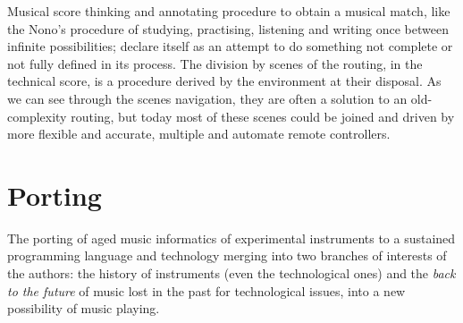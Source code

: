 \documentclass[twoside,a4paper]{article}
\begin{document}
Musical score thinking and annotating procedure to obtain a musical match, like the Nono's procedure of studying, practising, listening and writing once between infinite possibilities; declare itself as an attempt to do something not complete or not fully defined in its process. The division by scenes of the routing, in the technical score, is a procedure derived by the environment at their disposal. As we can see through the scenes navigation, they are often a solution to an old-complexity routing, but today most of these scenes could be joined and driven by more flexible and accurate, multiple and automate remote controllers. 



\section{Porting}
\label{sec:porting}

The porting of aged music informatics of experimental instruments to a sustained programming language and technology merging into two branches of interests of the authors: the history of instruments (even the technological ones) and the \emph{back to the future} of music lost in the past for technological issues, into a new possibility of music playing. 
\end{document}
